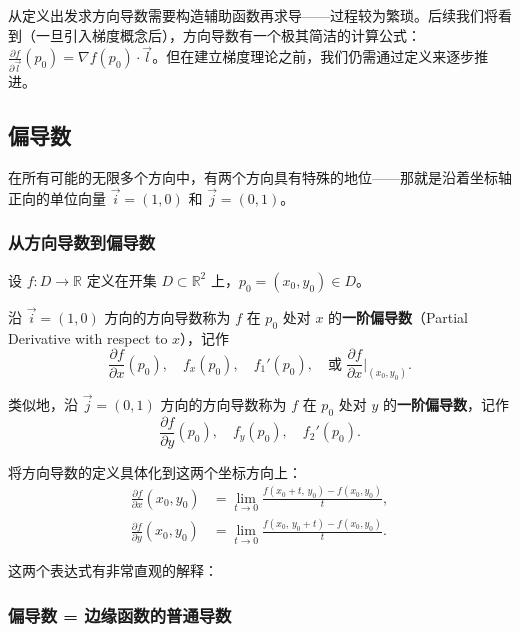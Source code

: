 \documentclass[lang=cn,11pt]{elegantbook}
\begin{document}
\begin{remark}[直接法的局限性]
从定义出发求方向导数需要构造辅助函数再求导——过程较为繁琐。后续我们将看到（一旦引入梯度概念后），方向导数有一个极其简洁的计算公式：
$\displaystyle\frac{\partial f}{\partial\vec l}(p_0)= \nabla f(p_0)\cdot\vec l$。但在建立梯度理论之前，我们仍需通过定义来逐步推进。
\end{remark}


\subsection{偏导数}

在所有可能的无限多个方向中，有两个方向具有特殊的地位——那就是沿着坐标轴正向的单位向量 $\vec i=(1,0)$ 和 $\vec j=(0,1)$。

\subsubsection*{从方向导数到偏导数}

\begin{definition} \label{def:partial-derivative}
设 $f:D\to\mathbb R$ 定义在开集 $D\subset\mathbb R^2$ 上，$p_0=(x_0,y_0)\in D$。

沿 $\vec i=(1,0)$ 方向的方向导数称为 $f$ 在 $p_0$ 处对 $x$ 的\textbf{一阶偏导数}（Partial Derivative with respect to $x$），记作
\[
\frac{\partial f}{\partial x}(p_0),\quad f_x(p_0),\quad f_1'(p_0),\quad \text{或}\;\frac{\partial f}{\partial x}\biggr|_{(x_0,y_0)}.
\]

类似地，沿 $\vec j=(0,1)$ 方向的方向导数称为 $f$ 在 $p_0$ 处对 $y$ 的\textbf{一阶偏导数}，记作
\[
\frac{\partial f}{\partial y}(p_0),\quad f_y(p_0),\quad f_2'(p_0).
\]
\end{definition}

将方向导数的定义具体化到这两个坐标方向上：
\begin{align*}
\frac{\partial f}{\partial x}(x_0,y_0) &=\lim_{t\to 0}\frac{f(x_0+t,\,y_0)-f(x_0,y_0)}{t}, \\[8pt]
\frac{\partial f}{\partial y}(x_0,y_0) &=\lim_{t\to 0}\frac{f(x_0,\,y_0+t)-f(x_0,y_0)}{t}.
\end{align*}

这两个表达式有非常直观的解释：

\subsubsection*{偏导数 = 边缘函数的普通导数}
\end{document}
